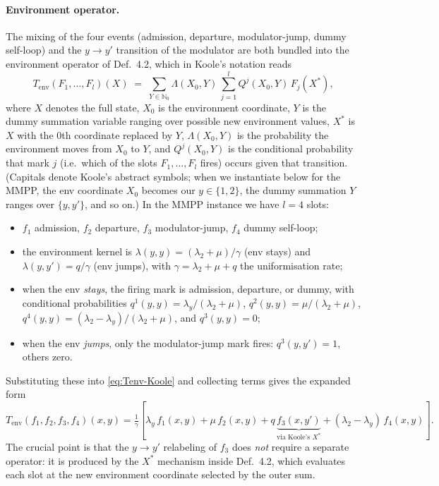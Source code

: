 \documentclass[11pt,a4paper]{article}
\newcommand{\N}{\mathbb{N}}
\newcommand{\Tenv}{T_{\mathrm{env}}}
\theoremstyle{definition}
\begin{document}
\paragraph{Environment operator.}
The mixing of the four events (admission, departure, modulator-jump,
dummy self-loop) and the $y \to y'$ transition of the modulator are
both bundled into the environment operator of Def.~4.2, which in
Koole's notation reads
\begin{equation}
\label{eq:Tenv-Koole}
\Tenv(F_1, \ldots, F_l)(X) \;=\; \sum_{Y \in \N_0} \Lambda(X_0, Y)\,
\sum_{j=1}^{l} Q^j(X_0, Y)\, F_j(X^*),
\end{equation}
where $X$ denotes the full state, $X_0$ is the environment coordinate,
$Y$ is the dummy summation variable ranging over possible new
environment values, $X^*$ is $X$ with the 0th coordinate replaced by
$Y$, $\Lambda(X_0, Y)$ is the probability the environment moves from
$X_0$ to $Y$, and $Q^j(X_0, Y)$ is the conditional probability that
mark $j$ (i.e.\ which of the slots $F_1, \ldots, F_l$ fires) occurs
given that transition. (Capitals denote Koole's abstract symbols;
when we instantiate below for the MMPP, the env coordinate $X_0$
becomes our $y \in \{1, 2\}$, the dummy summation $Y$ ranges over
$\{y, y'\}$, and so on.) In the MMPP instance we have $l = 4$
slots:
\begin{itemize}[leftmargin=2em, itemsep=2pt]
    \item $f_1$ admission, $f_2$ departure, $f_3$ modulator-jump,
        $f_4$ dummy self-loop;
    \item the environment kernel is
        $\lambda(y, y) = (\lambda_2 + \mu)/\gamma$ (env stays) and
        $\lambda(y, y') = q/\gamma$ (env jumps), with
        $\gamma = \lambda_2 + \mu + q$ the uniformisation rate;
    \item when the env \emph{stays}, the firing mark is admission,
        departure, or dummy, with conditional probabilities
        $q^1(y, y) = \lambda_y/(\lambda_2 + \mu)$,
        $q^2(y, y) = \mu/(\lambda_2 + \mu)$,
        $q^4(y, y) = (\lambda_2 - \lambda_y)/(\lambda_2 + \mu)$,
        and $q^3(y, y) = 0$;
    \item when the env \emph{jumps}, only the modulator-jump mark
        fires: $q^3(y, y') = 1$, others zero.
\end{itemize}
Substituting these into \eqref{eq:Tenv-Koole} and collecting terms
gives the expanded form
\begin{equation}
\label{eq:Tenv-expanded}
\Tenv(f_1, f_2, f_3, f_4)(x, y) =
\tfrac{1}{\gamma}\!\left[
    \lambda_y\, f_1(x, y)
    + \mu\, f_2(x, y)
    + q\, \underbrace{f_3(x, y')}_{\text{via Koole's }X^*}
    + (\lambda_2 - \lambda_y)\, f_4(x, y)
\right].
\end{equation}
The crucial point is that the $y \to y'$ relabeling of $f_3$ does
\emph{not} require a separate operator: it is produced by the $X^*$
mechanism inside Def.~4.2, which evaluates each slot at the new
environment coordinate selected by the outer sum.
\end{document}
